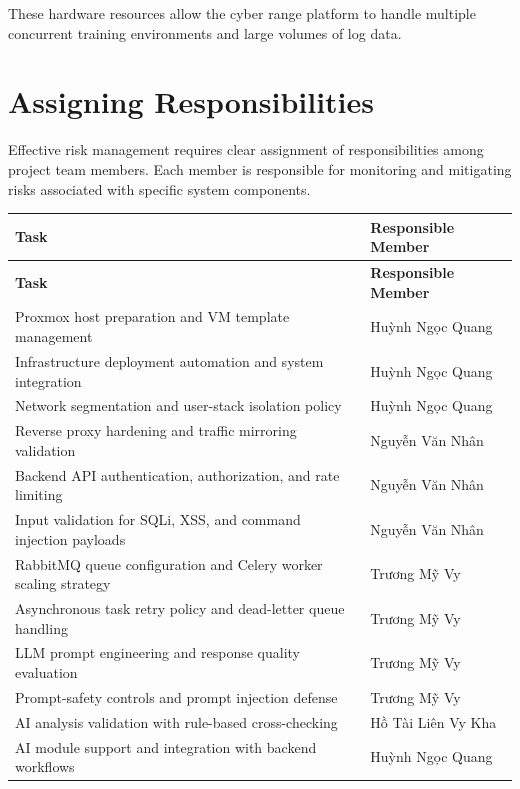 These hardware resources allow the cyber range platform to handle multiple concurrent training environments and large volumes of log data.

\section{Assigning Responsibilities}
Effective risk management requires clear assignment of responsibilities among project team members. Each member is responsible for monitoring and mitigating risks associated with specific system components.

\vspace{\baselineskip}
\setlength{\LTpre}{0pt}
\setlength{\LTpost}{0pt}
\renewcommand{\arraystretch}{1.2}
\begin{longtable}{|p{}|p{}|}
    \hline
    \textbf{Task} & \textbf{Responsible Member} \\
    \hline
    \endfirsthead
    \hline
    \textbf{Task} & \textbf{Responsible Member} \\
    \hline
    \endhead
    Proxmox host preparation and VM template management & Huỳnh Ngọc Quang \\
    \hline
    Infrastructure deployment automation and system integration & Huỳnh Ngọc Quang \\
    \hline
    Network segmentation and user-stack isolation policy & Huỳnh Ngọc Quang \\
    \hline
    Reverse proxy hardening and traffic mirroring validation & Nguyễn Văn Nhân \\
    \hline
    Backend API authentication, authorization, and rate limiting & Nguyễn Văn Nhân \\
    \hline
    Input validation for SQLi, XSS, and command injection payloads & Nguyễn Văn Nhân \\
    \hline
    RabbitMQ queue configuration and Celery worker scaling strategy & Trương Mỹ Vy \\
    \hline
    Asynchronous task retry policy and dead-letter queue handling & Trương Mỹ Vy \\
    \hline
    LLM prompt engineering and response quality evaluation & Trương Mỹ Vy \\
    \hline
    Prompt-safety controls and prompt injection defense & Trương Mỹ Vy \\
    \hline
    AI analysis validation with rule-based cross-checking & Hồ Tài Liên Vy Kha \\
    \hline
    AI module support and integration with backend workflows & Huỳnh Ngọc Quang \\

\end{longtable}

